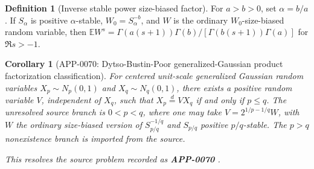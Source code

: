 \documentclass[11pt]{article}
\numberwithin{equation}{section}
\newtheorem{corollary}[theorem]{Corollary}
\theoremstyle{definition}
\newtheorem{definition}{Definition}[section]
\theoremstyle{remark}
\newcommand{\1}{\mathbf 1}
\begin{document}
\begin{definition}[Inverse stable power size-biased factor]
\label{res:inversestable-sizebiasfactor}
For \(a>b>0\), set \(\alpha=b/a\). If \(S_\alpha\) is positive \(\alpha\)-stable, \(W_0=S_\alpha^{-b}\), and \(W\) is the ordinary \(W_0\)-size-biased random variable, then \(\mathbb E W^s=\Gamma(a(s+1))\Gamma(b)/[\Gamma(b(s+1))\Gamma(a)]\) for \(\Re s>-1\).
\end{definition}

\begin{corollary}[APP-0070: Dytso-Bustin-Poor generalized-Gaussian product factorization classification]
\label{res:dytsobustinpoor-generalizedgaussian-productfactorization-classification}
For centered unit-scale generalized Gaussian random variables \(X_p\sim N_p(0,1)\) and \(X_q\sim N_q(0,1)\), there exists a positive random variable \(V\), independent of \(X_q\), such that \(X_p\stackrel d=V X_q\) if and only if \(p\le q\). The unresolved source branch is \(0<p<q\), where one may take \(V=2^{1/p-1/q}W\), with \(W\) the ordinary size-biased version of \(S_{p/q}^{-1/q}\) and \(S_{p/q}\) positive \(p/q\)-stable. The \(p>q\) nonexistence branch is imported from the source.



This resolves the source problem recorded as \textbf{APP-0070} \cite{app-app-0070-source}.
\end{corollary}
\end{document}
